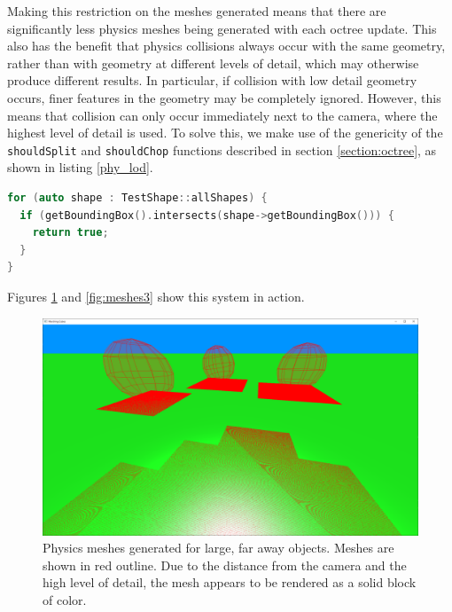 \documentclass{article}
\begin{document}
Making this restriction on the meshes generated means that there are significantly less physics meshes being generated with each octree update. This also has the benefit that physics collisions always occur with the same geometry, rather than with geometry at different levels of detail, which may otherwise produce different results. In particular, if collision with low detail geometry occurs, finer features in the geometry may be completely ignored. However, this means that collision can only occur immediately next to the camera, where the highest level of detail is used. To solve this, we make use of the genericity of the \texttt{shouldSplit} and \texttt{shouldChop} functions described in section \ref{section:octree}, as shown in listing \ref{phy_lod}.
\begin{lstlisting}[language=C++,label={phy_lod},caption={Snippet from \texttt{shouldSplit} responsible for increasing the level of detail near a set of test physics objects. All chunks with bounding boxes that intersect the bounding box of a physics shape will be split until the highest detail level is reached. The octree refinement process described in section \ref{section:octree_refinement} ensures that this does not create any places where very different levels of detail are adjacent to each other.}]
for (auto shape : TestShape::allShapes) {
  if (getBoundingBox().intersects(shape->getBoundingBox())) {
    return true;
  }
}
\end{lstlisting}

Figures \ref{fig:meshes2} and \ref{fig:meshes3} show this system in action.

\begin{figure}[H]
  \includegraphics[width=\textwidth]{meshes2.png}
  \caption{Physics meshes generated for large, far away objects. Meshes are shown in red outline. Due to the distance from the camera and the high level of detail, the mesh appears to be rendered as a solid block of color.}
  \label{fig:meshes2}
\end{figure}
\end{document}
